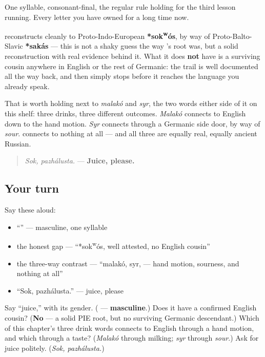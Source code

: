 One syllable, consonant-final, the regular rule holding for the third lesson running. Every letter you have owned for a long time now.

\begin{cousinweb}
\textbf{} reconstructs cleanly to Proto-Indo-European \textbf{*sok\textsuperscript{w}ós}, by way of Proto-Balto-Slavic \textbf{*sakás} — this is not a shaky guess the way \emph{}'s root was, but a solid reconstruction with real evidence behind it. What it does \textbf{not} have is a surviving cousin anywhere in English or the rest of Germanic: the trail is well documented all the way back, and then simply stops before it reaches the language you already speak.

That is worth holding next to \emph{malakó} and \emph{syr}, the two words either side of it on this shelf: three drinks, three different outcomes. \emph{Malakó} connects to English down to the hand motion. \emph{Syr} connects through a Germanic side door, by way of \emph{sour}. \emph{} connects to nothing at all — and all three are equally real, equally ancient Russian.

\begin{quote}
\emph{Sok, pazhálusta.} — \textbf{Juice, please.}
\end{quote}
\end{cousinweb}

\subsection*{Your turn}
Say these aloud:

\begin{itemize}
\raggedright
  \item \textquotedblleft{}\textquotedblright{} — masculine, one syllable
  \item the honest gap — \textquotedblleft{}*sok\textsuperscript{w}ós, well attested, no English cousin\textquotedblright{}
  \item the three-way contrast — \textquotedblleft{}malakó, syr,  — hand motion, sourness, and nothing at all\textquotedblright{}
  \item \textquotedblleft{}Sok, pazhálusta.\textquotedblright{} — juice, please
\end{itemize}

\begin{tcolorbox}[breakable,colback=teal!4,colframe=teal!35!black,title={Before you move on}]
Say \textquotedblleft{}juice,\textquotedblright{} with its gender. (\textbf{} — \textbf{masculine}.) Does it have a confirmed English cousin? (\textbf{No} — a solid PIE root, but no surviving Germanic descendant.) Which of this chapter's three drink words connects to English through a hand motion, and which through a taste? (\emph{Malakó} through milking; \emph{syr} through \emph{sour}.) Ask for juice politely. (\emph{Sok, pazhálusta.})
\end{tcolorbox}
